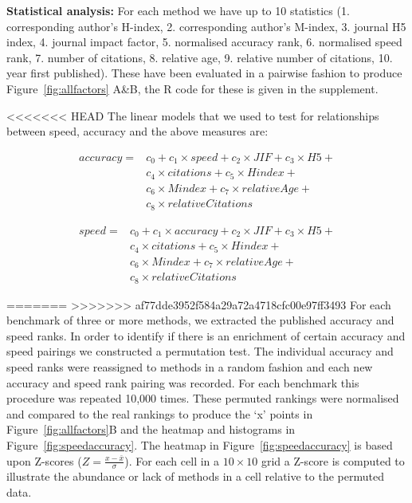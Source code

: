 \documentclass[fleqn,10pt]{SelfArx} %
\begin{document}
\textbf{Statistical analysis:} For each method we have up to 10 statistics (1. corresponding author’s H-index, 2. corresponding author’s M-index, 3. journal H5 index, 4. journal impact factor, 5. normalised accuracy rank, 6. normalised speed rank, 7. number of citations, 8. relative age, 9. relative number of citations, 10. year first published). These have been evaluated in a pairwise fashion to produce Figure~\ref{fig:allfactors} A\&B, the R code for these is given in the supplement. 

<<<<<<< HEAD
The linear models that we used to test for relationships between speed, accuracy and the above measures are:

\begin{equation*}
\begin{split}
accuracy=& c_0+c_1\times speed+c_2\times JIF+c_3\times H5+\\
& c_4\times citations+c_5\times Hindex+\\
& c_6\times Mindex+c_7\times relativeAge+\\
& c_8\times relativeCitations
\end{split}
\end{equation*}

\begin{equation*}
\begin{split}
speed=& c_0+c_{1}\times accuracy+c_{2}\times JIF+c_{3}\times H5+\\
& c_{4}\times citations+c_{5}\times Hindex+\\
& c_{6}\times Mindex+c_{7}\times relativeAge+\\
& c_{8}\times relativeCitations
\end{split}
\end{equation*}


=======
>>>>>>> af77dde3952f584a29a72a4718cfc00e97ff3493
For each benchmark of three or more methods, we extracted the published accuracy and speed ranks. In order to identify if there is an enrichment of certain accuracy and speed pairings we constructed a permutation test. The individual accuracy and speed ranks were reassigned to methods in a random fashion and each new accuracy and speed rank pairing was recorded. For each benchmark this procedure was repeated 10,000 times. These permuted rankings were normalised and compared to the real rankings to produce the ‘x’ points in Figure~\ref{fig:allfactors}B and the heatmap and histograms in Figure~\ref{fig:speedaccuracy}. The heatmap in Figure~\ref{fig:speedaccuracy} is based upon Z-scores ($Z=\frac{x-\bar{x}}{\sigma}$). For each cell in a $10\times 10$ grid a Z-score is computed to illustrate the abundance or lack of methods in a cell relative to the permuted data.
\end{document}

